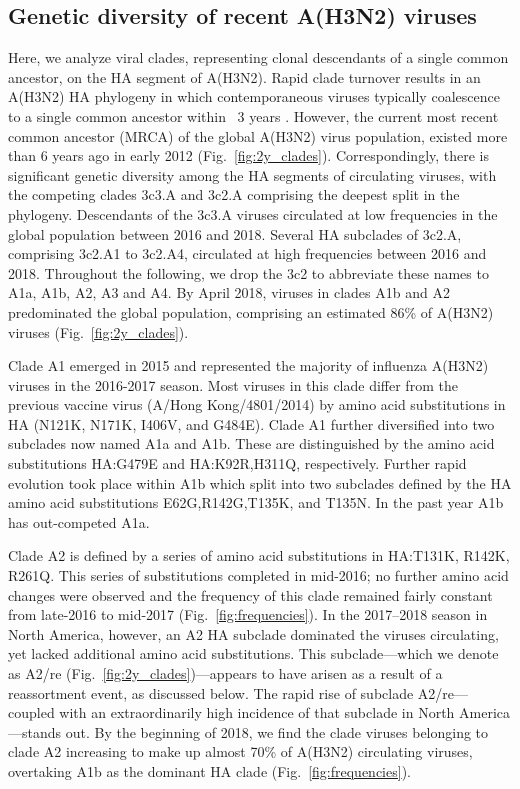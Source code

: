 \subsection*{Genetic diversity of recent A(H3N2) viruses}
Here, we analyze viral clades, representing clonal descendants of a single common ancestor, on the HA segment of A(H3N2).
Rapid clade turnover results in an A(H3N2) HA phylogeny in which contemporaneous viruses typically coalescence to a single common ancestor within ~3 years \citep{bedford_global_2015}.
However, the current most recent common ancestor (MRCA) of the global A(H3N2) virus population, existed more than 6 years ago in early 2012 (Fig.~\ref{fig:2y_clades}).
Correspondingly, there is significant genetic diversity among the HA segments of circulating viruses, with the competing clades 3c3.A and 3c2.A comprising the deepest split in the phylogeny.
Descendants of the 3c3.A viruses circulated at low frequencies in the global population between 2016 and 2018.
Several HA subclades of 3c2.A, comprising 3c2.A1 to 3c2.A4, circulated at high frequencies between 2016 and 2018.
Throughout the following, we drop the 3c2 to abbreviate these names to A1a, A1b, A2, A3 and A4.
By April 2018, viruses in clades A1b and A2 predominated the global population, comprising an estimated 86\% of A(H3N2) viruses (Fig.~\ref{fig:2y_clades}).

Clade A1 emerged in 2015 and represented the majority of influenza A(H3N2) viruses in the 2016-2017 season.
Most viruses in this clade differ from the previous vaccine virus (A/Hong Kong/4801/2014) by amino acid substitutions in HA (N121K, N171K, I406V, and G484E).
Clade A1 further diversified into two subclades now named A1a and A1b.
These are distinguished by the amino acid substitutions HA:G479E and HA:K92R,H311Q, respectively.
Further rapid evolution took place within A1b which split into two subclades defined by the HA amino acid substitutions E62G,R142G,T135K, and T135N.
In the past year A1b has out-competed A1a.

Clade A2 is defined by a series of amino acid substitutions in HA:T131K, R142K, R261Q.
This series of substitutions completed in mid-2016; no further amino acid changes were observed and the frequency of this clade remained fairly constant from late-2016 to mid-2017 (Fig.~\ref{fig:frequencies}).
In the 2017--2018 season in North America, however, an A2 HA subclade dominated the viruses circulating, yet lacked additional amino acid substitutions.
This subclade---which we denote as A2/re (Fig.~\ref{fig:2y_clades})---appears to have arisen as a result of a reassortment event, as discussed below.
The rapid rise of subclade A2/re---coupled with an extraordinarily high incidence of that subclade in North America---stands out.
By the beginning of 2018, we find the clade viruses belonging to clade A2 increasing to make up almost 70\% of A(H3N2) circulating viruses, overtaking A1b as the dominant HA clade (Fig.~\ref{fig:frequencies}).


